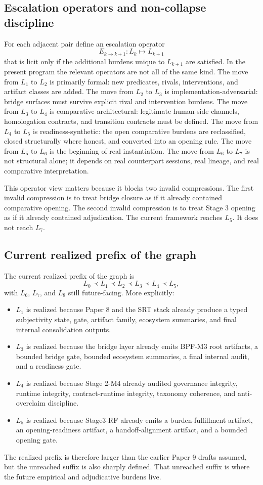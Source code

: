 \documentclass[11pt,a4paper]{article}
\theoremstyle{definition}
\begin{document}
\subsection{Escalation operators and non-collapse discipline}
For each adjacent pair define an escalation operator
\[
E_{k\rightarrow k+1}: L_k \mapsto L_{k+1}
\]
that is licit only if the additional burdens unique to $L_{k+1}$ are satisfied. In the present program the relevant operators are not all of the same kind. The move from $L_1$ to $L_2$ is primarily formal: new predicates, rivals, interventions, and artifact classes are added. The move from $L_2$ to $L_3$ is implementation-adversarial: bridge surfaces must survive explicit rival and intervention burdens. The move from $L_3$ to $L_4$ is comparative-architectural: legitimate human-side channels, homologation contracts, and transition contracts must be defined. The move from $L_4$ to $L_5$ is readiness-synthetic: the open comparative burdens are reclassified, closed structurally where honest, and converted into an opening rule. The move from $L_5$ to $L_6$ is the beginning of real instantiation. The move from $L_6$ to $L_7$ is not structural alone; it depends on real counterpart sessions, real lineage, and real comparative interpretation.

This operator view matters because it blocks two invalid compressions. The first invalid compression is to treat bridge closure as if it already contained comparative opening. The second invalid compression is to treat Stage 3 opening as if it already contained adjudication. The current framework reaches $L_5$. It does not reach $L_7$.

\subsection{Current realized prefix of the graph}
The current realized prefix of the graph is
\[
L_0 \prec L_1 \prec L_2 \prec L_3 \prec L_4 \prec L_5,
\]
with $L_6$, $L_7$, and $L_8$ still future-facing. More explicitly:
\begin{itemize}[leftmargin=1.5em]
\item $L_1$ is realized because Paper 8 and the SRT stack already produce a typed subjectivity state, gate, artifact family, ecosystem summaries, and final internal consolidation outputs.
\item $L_3$ is realized because the bridge layer already emits BPF-M3 root artifacts, a bounded bridge gate, bounded ecosystem summaries, a final internal audit, and a readiness gate.
\item $L_4$ is realized because Stage 2-M4 already audited governance integrity, runtime integrity, contract-runtime integrity, taxonomy coherence, and anti-overclaim discipline.
\item $L_5$ is realized because Stage3-RF already emits a burden-fulfillment artifact, an opening-readiness artifact, a handoff-alignment artifact, and a bounded opening gate.
\end{itemize}
The realized prefix is therefore larger than the earlier Paper 9 drafts assumed, but the unreached suffix is also sharply defined. That unreached suffix is where the future empirical and adjudicative burdens live.
\end{document}
